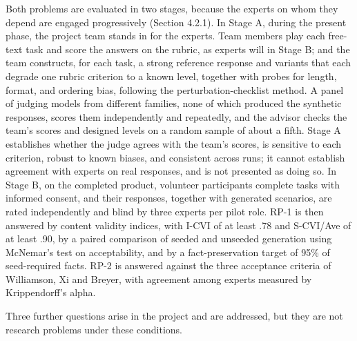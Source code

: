 Both problems are evaluated in two stages, because the experts on whom they depend are engaged progressively (Section 4.2.1). In Stage A, during the present phase, the project team stands in for the experts. Team members play each free-text task and score the answers on the rubric, as experts will in Stage B; and the team constructs, for each task, a strong reference response and variants that each degrade one rubric criterion to a known level, together with probes for length, format, and ordering bias, following the perturbation-checklist method\cite{r73}. A panel of judging models from different families, none of which produced the synthetic responses, scores them independently and repeatedly\cite{r74}, and the advisor checks the team's scores and designed levels on a random sample of about a fifth. Stage A establishes whether the judge agrees with the team's scores, is sensitive to each criterion, robust to known biases, and consistent across runs; it cannot establish agreement with experts on real responses, and is not presented as doing so. In Stage B, on the completed product, volunteer participants complete tasks with informed consent, and their responses, together with generated scenarios, are rated independently and blind by three experts per pilot role. RP-1 is then answered by content validity indices, with I-CVI of at least .78 and S-CVI/Ave of at least .90\cite{r70}, by a paired comparison of seeded and unseeded generation using McNemar's test on acceptability, and by a fact-preservation target of 95\% of seed-required facts. RP-2 is answered against the three acceptance criteria of Williamson, Xi and Breyer\cite{r71}, with agreement among experts measured by Krippendorff's alpha\cite{r72}.

Three further questions arise in the project and are addressed, but they are not research problems under these conditions.

